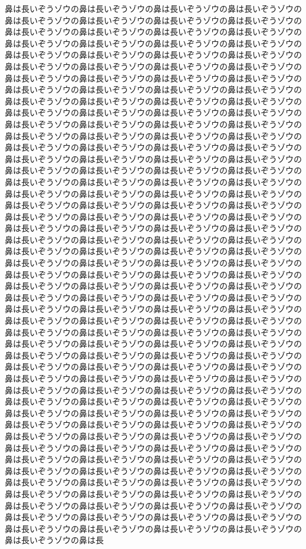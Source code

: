 鼻は長いぞうゾウの鼻は長いぞうゾウの鼻は長いぞうゾウの鼻は長いぞうゾウの鼻は長いぞうゾウの鼻は長いぞうゾウの鼻は長いぞうゾウの鼻は長いぞうゾウの鼻は長いぞうゾウの鼻は長いぞうゾウの鼻は長いぞうゾウの鼻は長いぞうゾウの鼻は長いぞうゾウの鼻は長いぞうゾウの鼻は長いぞうゾウの鼻は長いぞうゾウの鼻は長いぞうゾウの鼻は長いぞうゾウの鼻は長いぞうゾウの鼻は長いぞうゾウの鼻は長いぞうゾウの鼻は長いぞうゾウの鼻は長いぞうゾウの鼻は長いぞうゾウの鼻は長いぞうゾウの鼻は長いぞうゾウの鼻は長いぞうゾウの鼻は長いぞうゾウの鼻は長いぞうゾウの鼻は長いぞうゾウの鼻は長いぞうゾウの鼻は長いぞうゾウの鼻は長いぞうゾウの鼻は長いぞうゾウの鼻は長いぞうゾウの鼻は長いぞうゾウの鼻は長いぞうゾウの鼻は長いぞうゾウの鼻は長いぞうゾウの鼻は長いぞうゾウの鼻は長いぞうゾウの鼻は長いぞうゾウの鼻は長いぞうゾウの鼻は長いぞうゾウの鼻は長いぞうゾウの鼻は長いぞうゾウの鼻は長いぞうゾウの鼻は長いぞうゾウの鼻は長いぞうゾウの鼻は長いぞうゾウの鼻は長いぞうゾウの鼻は長いぞうゾウの鼻は長いぞうゾウの鼻は長いぞうゾウの鼻は長いぞうゾウの鼻は長いぞうゾウの鼻は長いぞうゾウの鼻は長いぞうゾウの鼻は長いぞうゾウの鼻は長いぞうゾウの鼻は長いぞうゾウの鼻は長いぞうゾウの鼻は長いぞうゾウの鼻は長いぞうゾウの鼻は長いぞうゾウの鼻は長いぞうゾウの鼻は長いぞうゾウの鼻は長いぞうゾウの鼻は長いぞうゾウの鼻は長いぞうゾウの鼻は長いぞうゾウの鼻は長いぞうゾウの鼻は長いぞうゾウの鼻は長いぞうゾウの鼻は長いぞうゾウの鼻は長いぞうゾウの鼻は長いぞうゾウの鼻は長いぞうゾウの鼻は長いぞうゾウの鼻は長いぞうゾウの鼻は長いぞうゾウの鼻は長いぞうゾウの鼻は長いぞうゾウの鼻は長いぞうゾウの鼻は長いぞうゾウの鼻は長いぞうゾウの鼻は長いぞうゾウの鼻は長いぞうゾウの鼻は長いぞうゾウの鼻は長いぞうゾウの鼻は長いぞうゾウの鼻は長いぞうゾウの鼻は長いぞうゾウの鼻は長いぞうゾウの鼻は長いぞうゾウの鼻は長いぞうゾウの鼻は長いぞうゾウの鼻は長いぞうゾウの鼻は長いぞうゾウの鼻は長いぞうゾウの鼻は長いぞうゾウの鼻は長いぞうゾウの鼻は長いぞうゾウの鼻は長いぞうゾウの鼻は長いぞうゾウの鼻は長いぞうゾウの鼻は長いぞうゾウの鼻は長いぞうゾウの鼻は長いぞうゾウの鼻は長いぞうゾウの鼻は長いぞうゾウの鼻は長いぞうゾウの鼻は長いぞうゾウの鼻は長いぞうゾウの鼻は長いぞうゾウの鼻は長いぞうゾウの鼻は長いぞうゾウの鼻は長いぞうゾウの鼻は長いぞうゾウの鼻は長いぞうゾウの鼻は長いぞうゾウの鼻は長いぞうゾウの鼻は長いぞうゾウの鼻は長いぞうゾウの鼻は長いぞうゾウの鼻は長いぞうゾウの鼻は長いぞうゾウの鼻は長いぞうゾウの鼻は長いぞうゾウの鼻は長いぞうゾウの鼻は長いぞうゾウの鼻は長いぞうゾウの鼻は長いぞうゾウの鼻は長いぞうゾウの鼻は長いぞうゾウの鼻は長いぞうゾウの鼻は長いぞうゾウの鼻は長いぞうゾウの鼻は長いぞうゾウの鼻は長いぞうゾウの鼻は長いぞうゾウの鼻は長いぞうゾウの鼻は長いぞうゾウの鼻は長いぞうゾウの鼻は長いぞうゾウの鼻は長いぞうゾウの鼻は長いぞうゾウの鼻は長いぞうゾウの鼻は長いぞうゾウの鼻は長いぞうゾウの鼻は長いぞうゾウの鼻は長いぞうゾウの鼻は長いぞうゾウの鼻は長いぞうゾウの鼻は長いぞうゾウの鼻は長いぞうゾウの鼻は長いぞうゾウの鼻は長いぞうゾウの鼻は長いぞうゾウの鼻は長いぞうゾウの鼻は長いぞうゾウの鼻は長いぞうゾウの鼻は長いぞうゾウの鼻は長いぞうゾウの鼻は長いぞうゾウの鼻は長いぞうゾウの鼻は長いぞうゾウの鼻は長いぞうゾウの鼻は長いぞうゾウの鼻は長いぞうゾウの鼻は長いぞうゾウの鼻は長いぞうゾウの鼻は長いぞうゾウの鼻は長いぞうゾウの鼻は長いぞうゾウの鼻は長いぞうゾウの鼻は長いぞうゾウの鼻は長いぞうゾウの鼻は長いぞうゾウの鼻は長いぞうゾウの鼻は長いぞうゾウの鼻は長いぞうゾウの鼻は長いぞうゾウの鼻は長いぞうゾウの鼻は長いぞうゾウの鼻は長